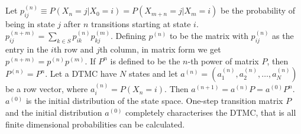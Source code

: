  Let $p^{(n)}_{ij} \equiv P(X_n = j|X_0 = i) = P(X_{m+n} = j | X_m = i)$ be the probability of being in state $j$ after $n$ transitions starting at state $i$.
 $p^{(n+m)}_{ij} = \sum_{k \in S}p^{(n)}_{ik}p^{(m)}_{kj}$. Defining $p^{(n)}$ to be the matrix with $p^{(n)}_{ij}$ as the entry in the $i$th row and $j$th column, in matrix form we get $p^{(n+m)} = p^{(n)}p^{(m)}.$
 If $P^n$ is defined to be the $n$-th power of matrix $P$, then $P^{(n)} = P^n$.
 Let a DTMC have $N$ states and let $a^{(n)} = (a^{(n)}_1, a^{(n)}_2, \ldots, a^{(n)}_N)$ be a row vector, where $a^{(n)}_i = P(X_n = i)$. Then $a^{(n+1)} = a^{(n)}P = a^{(0)}P^n$. $a^{(0)}$ is the initial distribution of the state space.
 One-step transition matrix $P$ and the initial distribution $a^{(0)}$ completely characterises the DTMC, that is all finite dimensional probabilities can be calculated.